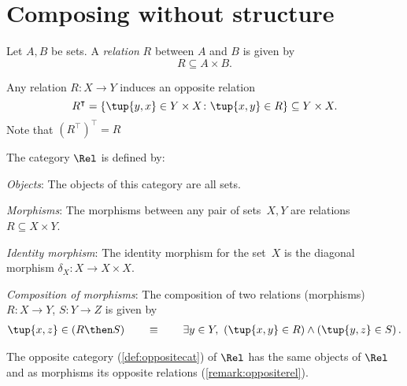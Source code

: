 \section{Composing without structure}

\begin{definition}[Relation]
Let $A,B$ be sets. A \emph{relation} $R$ between $A$ and $B$ is given by 
\begin{equation}
    R\subseteq A\times B.
\end{equation}
\end{definition}
\begin{remark}
\label{remark:oppositerel}
Any relation $R\colon X\to Y$ induces an opposite relation \begin{equation}
    R^\intercal =\{\tup{y,x}\in Y\times X\colon \tup{x,y}\in R\} \subseteq Y\times X.
\end{equation}
Note that $\left( R^\intercal\right)^\intercal = R$
\end{remark}

\begin{definition}
    The category $\Rel$ is defined by:
    \begin{compactenum}
    \item \emph{Objects}: The objects of this category are all sets.
    \item \emph{Morphisms}: The morphisms between any pair of sets~$X, Y$
    are relations $R\subseteq X\times Y$.
    \item \emph{Identity morphism}: The identity morphism for the set~$X$
    is the diagonal morphism $\delta_X \colon X\to X\times X$.
    \item \emph{Composition of morphisms}: The composition of two relations (morphisms) $R \colon X\to Y$, $S\colon Y\to Z$ is given by
    \begin{align}
    \tup{x,z} \in (R \then S) \qquad \equiv \qquad  \exists y \in Y, \ \left(\tup{x,y} \in R\right) \wedge \left(\tup{y,z} \in S\right).  	
    \end{align}
    \end{compactenum}
\end{definition}
\begin{remark}
The opposite category (\cref{def:oppositecat}) of $\Rel$ has the same objects of $\Rel$ and as morphisms its opposite relations (\cref{remark:oppositerel}).
\end{remark}

